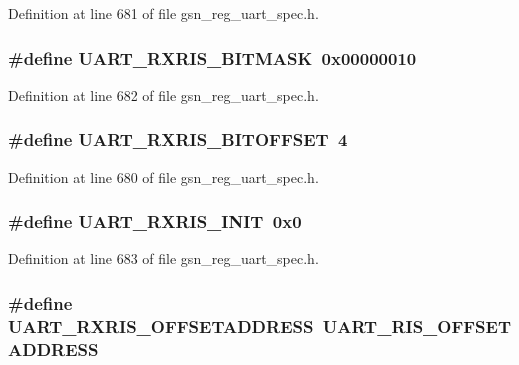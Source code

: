 Definition at line 681 of file gsn\_\-reg\_\-uart\_\-spec.h.

\hypertarget{a00575_a95d4209d9f0ebce6ed31bb26a8f3b3ce}{
\subsubsection[{UART\_\-RXRIS\_\-BITMASK}]{\setlength{\rightskip}{0pt plus 5cm}\#define UART\_\-RXRIS\_\-BITMASK~0x00000010}}
\label{a00575_a95d4209d9f0ebce6ed31bb26a8f3b3ce}


Definition at line 682 of file gsn\_\-reg\_\-uart\_\-spec.h.

\hypertarget{a00575_a6e324bf27b6e09af3e01039cebdc1ee6}{
\subsubsection[{UART\_\-RXRIS\_\-BITOFFSET}]{\setlength{\rightskip}{0pt plus 5cm}\#define UART\_\-RXRIS\_\-BITOFFSET~4}}
\label{a00575_a6e324bf27b6e09af3e01039cebdc1ee6}


Definition at line 680 of file gsn\_\-reg\_\-uart\_\-spec.h.

\hypertarget{a00575_a1079c71e5c92463935f85d8583dcf261}{
\subsubsection[{UART\_\-RXRIS\_\-INIT}]{\setlength{\rightskip}{0pt plus 5cm}\#define UART\_\-RXRIS\_\-INIT~0x0}}
\label{a00575_a1079c71e5c92463935f85d8583dcf261}


Definition at line 683 of file gsn\_\-reg\_\-uart\_\-spec.h.

\hypertarget{a00575_a03969ba97c78326b0d9ad5dd2f28e0b1}{
\subsubsection[{UART\_\-RXRIS\_\-OFFSETADDRESS}]{\setlength{\rightskip}{0pt plus 5cm}\#define UART\_\-RXRIS\_\-OFFSETADDRESS~UART\_\-RIS\_\-OFFSETADDRESS}}
\label{a00575_a03969ba97c78326b0d9ad5dd2f28e0b1}


